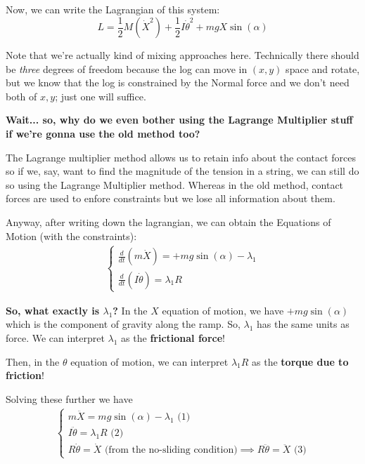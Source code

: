\documentclass[11pt]{article}
\begin{document}
\vskip 0.5cm
Now, we can write the Lagrangian of this system: 
\[ L = \frac{1}{2}M(\dot{X}^2) + \frac{1}{2}I \dot{\theta}^2 + mg X \sin(\alpha) \]

Note that we're actually kind of mixing approaches here. Technically there should be \emph{three} degrees of freedom because the log can move in $(x,y)$ space and rotate, but we know that the log is constrained by the Normal force and we don't need both of $x,y$; just one will suffice.

\begin{bluebox}
  \textbf{Wait... so, why do we even bother using the Lagrange Multiplier stuff if we're gonna use the old method too?} 

  \vskip 0.5cm
  The Lagrange multiplier method allows us to retain info about the contact forces so if we, say, want to find the magnitude of the tension in a string, we can still do so using the Lagrange Multiplier method. Whereas in the old method, contact forces are used to enfore constraints but we lose all information about them.
\end{bluebox}

\vskip 0.5cm
Anyway, after writing down the lagrangian, we can obtain the Equations of Motion (with the constraints):
\begin{align*}
  \begin{cases}
    \frac{d}{dt} \left( m\dot{X}\right) = +mg \sin(\alpha) - \lambda_1 \\
    \frac{d}{dt} \left( I \dot{\theta} \right) = \lambda_1 R
  \end{cases}
\end{align*}

\begin{redbox}
  \textbf{So, what exactly is $\lambda_1$? }
  \vskip 0.5cm
  In the $X$ equation of motion, we have $+mg\sin(\alpha)$ which is the component of gravity along the ramp. So, $\lambda_1$ has the same units as force. We can interpret $\lambda_1$ as the \textbf{frictional force}! 

  \vskip 0.5cm
  Then, in the $\theta$ equation of motion, we can interpret $\lambda_1 R$ as the \textbf{torque due to friction}!
\end{redbox}

Solving these further we have 
\begin{align*}
  \begin{cases}
    m \ddot{X} = mg\sin(\alpha) - \lambda_1 \text{ (1)}\\
    I \ddot{\theta} = \lambda_1 R \text{ (2)}\\
    R \dot{\theta} = \dot{X} \text{ (from the no-sliding condition)} \implies R \ddot{\theta} = \ddot{X} \text{ (3)}
  \end{cases}
\end{align*}
\end{document}
